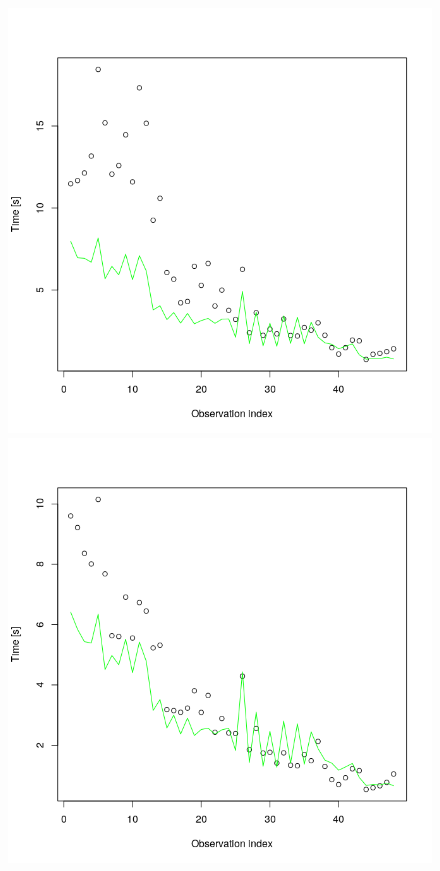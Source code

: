 \begin{figure}[htb]
\centering
\begin{minipage}{0.3\textwidth}
\includegraphics[width=\textwidth]{figures/htfeti-none.png}
\end{minipage}
\begin{minipage}{0.3\textwidth}
\includegraphics[width=\textwidth]{figures/htfeti-lumped.png}

\end{minipage}
\end{figure}
